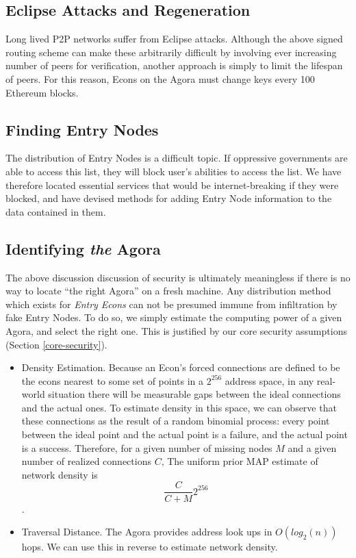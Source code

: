 \documentclass{article}
\begin{document}
\subsection{Eclipse Attacks and Regeneration}
\label{agora-regen}

Long lived P2P networks suffer from Eclipse attacks. Although the
above signed routing scheme can make these arbitrarily difficult by
involving ever increasing number of peers for verification, another
approach is simply to limit the lifespan of peers. For this reason,
Econs on the Agora must change keys every 100 Ethereum blocks.



\subsection{Finding Entry Nodes}
\label{bootstrapping}

The distribution of Entry Nodes is a difficult topic. If oppressive governments are able to access this list, they will block user's abilities to access the list. We have therefore located essential services that would be internet-breaking if they were blocked, and have devised methods for adding Entry Node information to the data contained in them.

\subsection{Identifying \emph{the} Agora}

The above discussion discussion of security is ultimately meaningless if there is no way to locate ``the right Agora'' on a fresh machine. Any distribution method which exists for \emph{Entry Econs} can not be presumed immune from infiltration by fake Entry Nodes. To do so, we simply estimate the computing power of a given Agora, and select the right one. This is justified by our core security assumptions (Section \ref{core-security}).

\begin{itemize}
\item Density Estimation. Because an Econ's forced connections are defined to be the econs nearest to some set of points in a $2^{256}$ address space, in any real-world situation there will be measurable gaps between the ideal connections and the actual ones. To estimate density in this space, we can observe that these connections as the result of a random binomial process: every point between the ideal point and the actual point is a failure, and the actual point is a success. Therefore, for a given number of missing nodes $M$ and a given number of realized connections $C$, The uniform prior MAP estimate of network density is $$\frac{C}{C + M} 2^{256}$$.
\item Traversal Distance. The Agora provides address look ups in $O(log_2(n))$ hops. We can use this in reverse to estimate network density.
\end{itemize}
\end{document}
